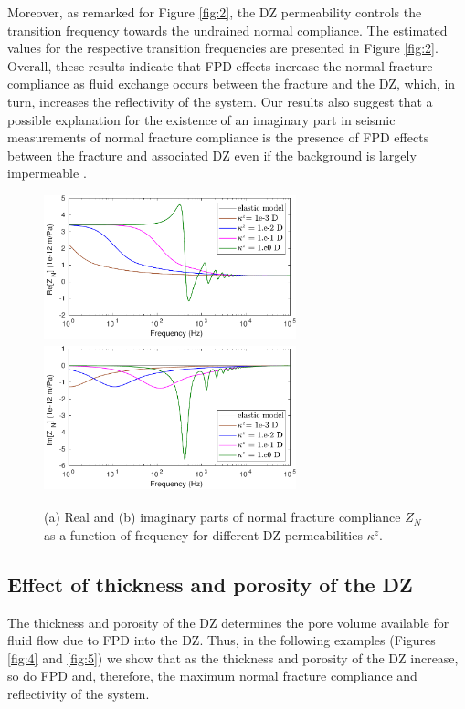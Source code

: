 \documentclass[draft]{agujournal2019}
\begin{document}
Moreover, as remarked for Figure \ref{fig:2}, the DZ permeability controls the transition frequency towards the undrained normal compliance. The estimated values  for the respective transition frequencies are presented in Figure \ref{fig:2}. Overall, these results indicate that FPD effects increase the normal fracture compliance as fluid exchange occurs between the fracture and the DZ, which, in turn, increases the reflectivity of the system. Our results also suggest that a possible explanation for the existence of an imaginary part in seismic measurements of  normal fracture compliance is the presence of FPD effects between the fracture and associated DZ even if the background is largely impermeable  \cite{Barbosa2019}.


\begin{figure}
\centering
    \subcaptionbox{}
      {
       \includegraphics[width=73mm, height=43 mm]{figures/elasporo_1mm_znsen_h20e-2.pdf}
        }
    \subcaptionbox{}
      {
        \includegraphics[width=73mm, height=43mm]{figures/elasporo_1mm_iznsen_h20e-2.pdf}
        }
\caption {(a) Real and (b) imaginary parts of  normal fracture compliance $Z_N$ as a function of frequency for different DZ permeabilities $\kappa^z$. } 
\label{fig:3}
\end{figure}

\subsection{Effect of thickness and porosity of the DZ}
The thickness and porosity of the DZ determines the pore volume available for fluid flow  due to FPD into the DZ. Thus, in the following examples (Figures \ref{fig:4} and \ref{fig:5}) we show that as the thickness and porosity of the DZ increase, so do FPD  and, therefore, the maximum normal fracture compliance and reflectivity of the system. 
\end{document}
